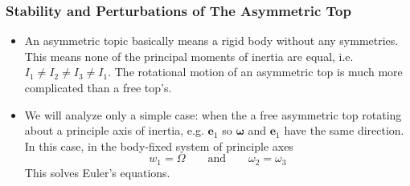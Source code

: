 \documentclass[11pt, a4paper]{article}
\newcommand{\eqtext}[1]{\qquad \text{#1} \qquad}
\newcommand{\e}{\mathbf{e}} %
\begin{document}
\subsubsection{Stability and Perturbations of The Asymmetric Top}
\begin{itemize}
	\item An asymmetric topic basically means a rigid body without any symmetries. This means none of the principal moments of inertia are equal, i.e. $ I_{1} \neq I_{2} \neq I_{3} \neq I_{1} $. The rotational motion of an asymmetric top is much more complicated than a free top's. 
	
	\item We will analyze only a simple case: when the a free asymmetric top rotating about a principle axis of inertia, e.g. $ \e_{1} $ so $ \bm{\omega} $ and $ \e_{1} $ have the same direction. In this case, in the body-fixed system of principle axes
	\begin{equation*}
		w_{1} = \Omega \eqtext{and} \omega_{2} = \omega_{3}
	\end{equation*}
	This solves Euler's equations. 
	

\end{itemize}
\end{document}
